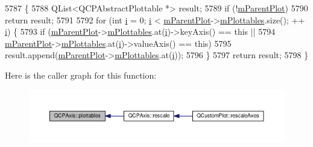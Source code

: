 \begin{DoxyCode}
5787                                                         \{
5788   QList<QCPAbstractPlottable *> result;
5789   \textcolor{keywordflow}{if} (!\hyperlink{class_q_c_p_layerable_aa2a528433e44db02b8aef23c1f9f90ed}{mParentPlot})
5790     \textcolor{keywordflow}{return} result;
5791 
5792   \textcolor{keywordflow}{for} (\textcolor{keywordtype}{int} \hyperlink{_comparision_pictures_2_createtest_image_8m_a6f6ccfcf58b31cb6412107d9d5281426}{i} = 0; \hyperlink{_comparision_pictures_2_createtest_image_8m_a6f6ccfcf58b31cb6412107d9d5281426}{i} < \hyperlink{class_q_c_p_layerable_aa2a528433e44db02b8aef23c1f9f90ed}{mParentPlot}->\hyperlink{class_q_custom_plot_a4b6c694fbdb2f201626f71eff2d1694e}{mPlottables}.size(); ++
      \hyperlink{_comparision_pictures_2_createtest_image_8m_a6f6ccfcf58b31cb6412107d9d5281426}{i}) \{
5793     \textcolor{keywordflow}{if} (\hyperlink{class_q_c_p_layerable_aa2a528433e44db02b8aef23c1f9f90ed}{mParentPlot}->\hyperlink{class_q_custom_plot_a4b6c694fbdb2f201626f71eff2d1694e}{mPlottables}.at(\hyperlink{_comparision_pictures_2_createtest_image_8m_a6f6ccfcf58b31cb6412107d9d5281426}{i})->keyAxis() == \textcolor{keyword}{this} ||
5794         \hyperlink{class_q_c_p_layerable_aa2a528433e44db02b8aef23c1f9f90ed}{mParentPlot}->\hyperlink{class_q_custom_plot_a4b6c694fbdb2f201626f71eff2d1694e}{mPlottables}.at(\hyperlink{_comparision_pictures_2_createtest_image_8m_a6f6ccfcf58b31cb6412107d9d5281426}{i})->valueAxis() == \textcolor{keyword}{this})
5795       result.append(\hyperlink{class_q_c_p_layerable_aa2a528433e44db02b8aef23c1f9f90ed}{mParentPlot}->\hyperlink{class_q_custom_plot_a4b6c694fbdb2f201626f71eff2d1694e}{mPlottables}.at(\hyperlink{_comparision_pictures_2_createtest_image_8m_a6f6ccfcf58b31cb6412107d9d5281426}{i}));
5796   \}
5797   \textcolor{keywordflow}{return} result;
5798 \}
\end{DoxyCode}


Here is the caller graph for this function\+:\nopagebreak
\begin{figure}[H]
\begin{center}
\leavevmode
\includegraphics[width=350pt]{class_q_c_p_axis_a4f7404494cccdbfc00e1e865b7ed16a4_icgraph}
\end{center}
\end{figure}


